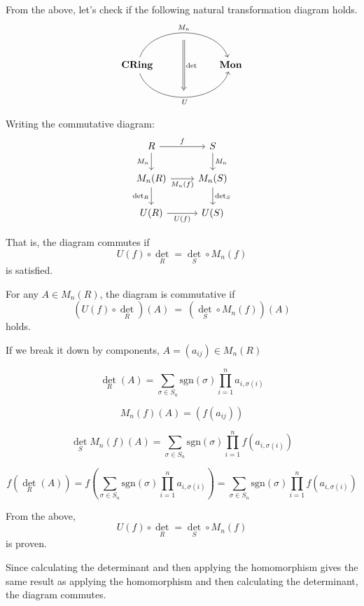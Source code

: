 \documentclass[uplatex,a4j,12pt,dvipdfmx]{jsarticle}
\begin{document}
From the above, let's check if the following natural transformation diagram holds.
\[
	\begin{tikzcd}
		& {} \arrow[dd, "\det", Rightarrow, shift right] &              \\
		\textbf{CRing} \arrow[rr, "M_{n}", bend left=71] \arrow[rr, "U"', bend right=71] &                                                & \textbf{Mon} \\
		& {}                                             &
	\end{tikzcd}
\]

Writing the commutative diagram:
\[
	\begin{tikzcd}
		R \arrow[r, "f"]
		\arrow[d, "M_n"']
		&
		S \arrow[d, "M_n"] \\
		M_n(R) \arrow[r, "M_n(f)"']
		\arrow[d, "\det_R"']
		&
		M_n(S) \arrow[d, "\det_S"] \\
		U(R) \arrow[r, "U(f)"']
		&
		U(S)
	\end{tikzcd}
\]

That is, the diagram commutes if
$$
	U(f) \circ \det_{R} = \det_{S} \circ M_{n}(f)
$$
is satisfied.

For any $A \in M_{n} (R)$, the diagram is commutative if
\[
	(U(f) \circ \det_{R}) (A)
	\ = \
	(\det_{S} \circ M_{n}(f)) (A)
\]
holds.

If we break it down by components, $A=(a_{ij}) \in M_{n} (R)$

\[
	\det_{R} (A) = \sum_{\sigma \in S_{n}} \text{sgn}(\sigma) \prod^{n}_{i=1} a_{i , \sigma(i)}
\]

\[
	M_{n}(f)(A) = (f(a_{ij}))
\]

\[
	\det_{S} M_{n}(f)(A)
	=
	\sum_{\sigma \in S_{n}} \text{sgn}(\sigma) \prod^{n}_{i=1} f(a_{i , \sigma(i)})
\]


\[
	f(\det_{R}(A))
	=
	f \left(
	\sum_{\sigma \in S_{n}} \text{sgn}(\sigma) \prod^{n}_{i=1} a_{i , \sigma(i)}
	\right)
	=
	\sum_{\sigma \in S_{n}} \text{sgn}(\sigma) \prod^{n}_{i=1} f(a_{i , \sigma(i)})
\]

From the above,
$$
	U(f) \circ \det_{R} = \det_{S} \circ M_{n}(f)
$$
is proven.

Since calculating the determinant and then applying the homomorphism gives the same result as applying the homomorphism and then calculating the determinant, the diagram commutes.
\end{document}
